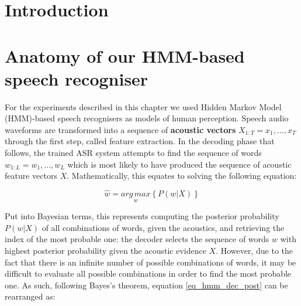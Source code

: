 
\section{Introduction}







\section{Anatomy of our HMM-based speech recogniser}
For the experiments described in this chapter we used Hidden Markov Model (HMM)-based speech recognisers as models of human perception. 
Speech audio waveforms are transformed into a sequence of \textbf{acoustic vectors} $X_{1:T} = x_{1}, ..., x_{T}$ through the first step, called feature extraction. In the decoding phase that follows, the trained ASR system attempts to find the sequence of words $w_{1:L} = w_{1}, ..., w_{L}$ which is most likely to have produced the sequence of acoustic feature vectors $X$.
Mathematically, this equates to solving the following equation:

\begin{equation}
  \widehat{w} = \underset{w}{arg\,max} \left \{  P(w|X)\right \}
  \label{eq_hmm_dec_post}
\end{equation}

Put into Bayesian terms, this represents computing the posterior probability $P(w|X)$ of all combinations of words, given the acoustics, and retrieving the index of the most probable one: the decoder selects the sequence of words $w$ with highest posterior probability given the acoustic evidence $X$. However, due to the fact that there is an infinite number of possible combinations of words, it may be difficult to evaluate all possible combinations in order to find the most probable one. As such, following Bayes's theorem, equation \ref{eq_hmm_dec_post} can be rearranged as:

